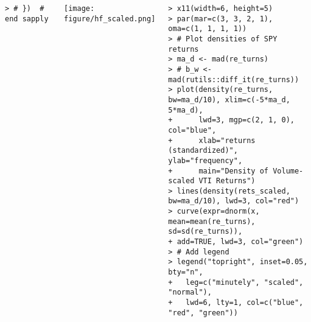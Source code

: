 \documentclass[10pt]{beamer}\usepackage[]{graphicx}\usepackage[]{color}
\makeatletter
\newenvironment{kframe}{%
 \def\at@end@of@kframe{}%
 \ifinner\ifhmode%
  \def\at@end@of@kframe{\end{minipage}}%
  \begin{minipage}{\columnwidth}%
 \fi\fi%
 \def\FrameCommand##1{\hskip\@totalleftmargin \hskip-\fboxsep
 \colorbox{shadecolor}{##1}\hskip-\fboxsep
     \hskip-\linewidth \hskip-\@totalleftmargin \hskip\columnwidth}%
 \MakeFramed {\advance\hsize-\width
   \@totalleftmargin\z@ \linewidth\hsize
   \@setminipage}}%
 {\par\unskip\endMakeFramed%
 \at@end@of@kframe}
\newenvironment{knitrout}{}{} %
\makeatother
\begin{document}
\begin{frame}[fragile,t]{\subsecname}
\begin{block}{}
\begin{columns}[T]
\begin{knitrout}
\begin{kframe}
\begin{verbatim}
> # })  # end sapply
\end{verbatim}
\end{kframe}
\end{knitrout}
      \vspace{-1em}
      \texttt{[image: figure/hf\_scaled.png]}
\begin{knitrout}\tiny
{}\color{fgcolor}\begin{kframe}
\begin{verbatim}
> x11(width=6, height=5)
> par(mar=c(3, 3, 2, 1), oma=c(1, 1, 1, 1))
> # Plot densities of SPY returns
> ma_d <- mad(re_turns)
> # b_w <- mad(rutils::diff_it(re_turns))
> plot(density(re_turns, bw=ma_d/10), xlim=c(-5*ma_d, 5*ma_d),
+      lwd=3, mgp=c(2, 1, 0), col="blue",
+      xlab="returns (standardized)", ylab="frequency",
+      main="Density of Volume-scaled VTI Returns")
> lines(density(rets_scaled, bw=ma_d/10), lwd=3, col="red")
> curve(expr=dnorm(x, mean=mean(re_turns), sd=sd(re_turns)),
+ add=TRUE, lwd=3, col="green")
> # Add legend
> legend("topright", inset=0.05, bty="n",
+   leg=c("minutely", "scaled", "normal"),
+   lwd=6, lty=1, col=c("blue", "red", "green"))
\end{verbatim}
\end{kframe}
\end{knitrout}
  \end{columns}
\end{block}

\end{frame}


\end{document}

